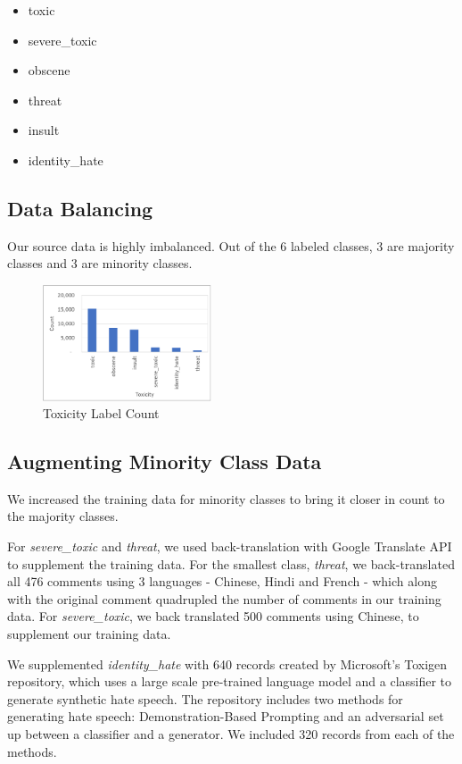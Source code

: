 \documentclass[11pt,a4paper]{article}
\begin{document}
\begin{itemize}
\item toxic
\item severe\_toxic
\item obscene
\item threat
\item insult
\item identity\_hate
\end{itemize}



\subsection{Data Balancing}
Our source data is highly imbalanced. Out of the 6 labeled classes, 3 are majority classes and 3 are minority classes.


\begin{figure}[h!]
\centering
\includegraphics[width=50mm,scale=0.5]{label_counts.png}
\caption{Toxicity Label Count}
\label{Fig1. label count vs toxicity}
\end{figure}


\subsection{Augmenting Minority Class Data}
We increased the training data for minority classes to bring it closer in count to the majority classes.

For \emph{severe\_toxic} and \emph{threat}, we used back-translation with Google Translate API to supplement the training data.  For the smallest class, \emph{threat}, we back-translated all 476 comments using 3 languages - Chinese, Hindi and French - which along with the original comment quadrupled the number of comments in our training data.  For \emph{severe\_toxic}, we back translated 500 comments using Chinese, to supplement our training data.

We supplemented \emph{identity\_hate} with 640 records created by Microsoft's Toxigen repository, which uses a large scale pre-trained language model and a classifier to generate synthetic hate speech.  The repository includes two methods for generating hate speech:  Demonstration-Based Prompting and an adversarial set up between a classifier and a generator.  We included 320 records from each of the methods.
\end{document}
